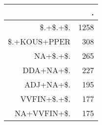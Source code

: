 \begin{tabular}{rr}
  \hline
 & . \\ 
  \hline
\$.+\$.+\$. & 1258 \\ 
  \$.+KOUS+PPER & 308 \\ 
  NA+\$.+\$. & 265 \\ 
  DDA+NA+\$. & 227 \\ 
  ADJ+NA+\$. & 195 \\ 
  VVFIN+\$.+\$. & 177 \\ 
  NA+VVFIN+\$. & 175 \\ 
   \hline
\end{tabular}

